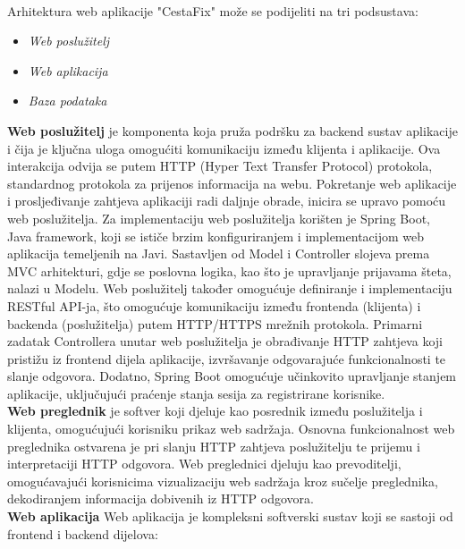 \noindent \\Arhitektura web aplikacije "CestaFix" može se podijeliti na tri podsustava:
\begin{itemize}
	\item 	\textit{Web poslužitelj}
	\item   \textit{Web aplikacija}
	\item   \textit{Baza podataka}
\end{itemize}

\noindent\textbf{Web poslužitelj} je komponenta koja pruža podršku za backend sustav aplikacije i čija je ključna uloga omogućiti komunikaciju između klijenta i aplikacije. Ova interakcija odvija se putem HTTP (Hyper Text Transfer Protocol) protokola, standardnog protokola za prijenos informacija na webu. Pokretanje web aplikacije i prosljeđivanje zahtjeva aplikaciji radi daljnje obrade, inicira se upravo pomoću web poslužitelja. Za implementaciju web poslužitelja korišten je Spring Boot, Java framework, koji se ističe brzim konfiguriranjem i implementacijom web aplikacija temeljenih na Javi. Sastavljen od Model i Controller slojeva prema MVC arhitekturi, gdje se poslovna logika, kao što je upravljanje prijavama šteta, nalazi u Modelu. Web poslužitelj također omogućuje definiranje i implementaciju RESTful API-ja, što omogućuje komunikaciju između frontenda (klijenta) i backenda (poslužitelja) putem HTTP/HTTPS mrežnih protokola. Primarni zadatak Controllera unutar web poslužitelja je obrađivanje HTTP zahtjeva koji pristižu iz frontend dijela aplikacije, izvršavanje odgovarajuće funkcionalnosti te slanje odgovora. Dodatno, Spring Boot omogućuje učinkovito upravljanje stanjem aplikacije, uključujući praćenje stanja sesija za registrirane korisnike.
\newline
\textbf{\\Web preglednik} je softver koji djeluje kao posrednik između poslužitelja i klijenta, omogućujući korisniku prikaz web sadržaja. Osnovna funkcionalnost web preglednika ostvarena je pri slanju HTTP zahtjeva poslužitelju te prijemu i interpretaciji HTTP odgovora. Web preglednici djeluju kao prevoditelji, omogućavajući korisnicima vizualizaciju web sadržaja kroz sučelje preglednika, dekodiranjem informacija dobivenih iz HTTP odgovora.
\newline
\textbf{\\Web aplikacija} Web aplikacija je kompleksni softverski sustav koji se sastoji od frontend i backend dijelova:
